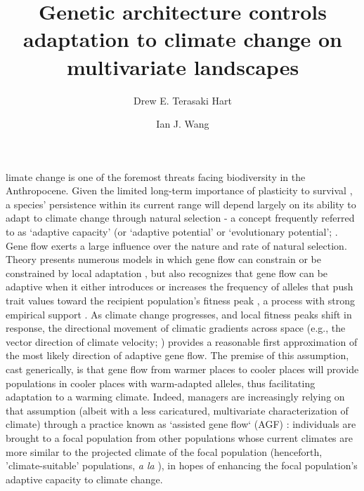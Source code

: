 \documentclass[9pt,twocolumn,twoside,lineno]{pnas-new}
\title{Genetic architecture controls adaptation to climate change on multivariate landscapes}
\author[a,1]{Drew E. Terasaki Hart}
\author[a]{Ian J. Wang}
\affil[a]{Department of Environmental Science, Policy, and Management, University of California, Berkeley, CA 94720}
\begin{document}
\maketitle
\thispagestyle{firststyle}

limate change is one of the foremost threats facing biodiversity in the Anthropocene.
Given the limited long-term importance of plasticity to survival \cite{chevin},
a species’ persistence within its current range will depend largely on its ability to
adapt to climate change through natural selection - a concept frequently referred to 
as `adaptive capacity’ (or `adaptive potential’ or `evolutionary potential’; 
\cite{chevin,harrisson,nicotra,vilas,wade}.
Gene flow exerts a large influence over the nature and rate of natural selection. 
Theory presents numerous models
in which gene flow can constrain or be constrained by
local adaptation \cite{wang,lenormand,slatkin,haldane,wright,felsenstein},
but also recognizes that gene flow can be adaptive when it 
either introduces or increases the frequency of alleles 
that push trait values toward
the recipient population's fitness peak \cite{aitken_whitlock,slatkin,tigano},
a process with strong empirical support \cite{feder}. 
As climate change progresses,
and local fitness peaks shift in response, 
the directional movement of climatic gradients across space (e.g., the vector
direction of climate velocity; \cite{ackerly}) provides a reasonable first 
approximation of the most likely direction of adaptive gene flow. The premise of this 
assumption, cast generically, is that gene flow from warmer places to 
cooler places will provide populations in cooler places with warm-adapted alleles,
thus facilitating adaptation to a warming climate. 
Indeed, managers are increasingly relying on that assumption
(albeit with a less caricatured, multivariate characterization of climate)
through a practice known as `assisted gene flow` (AGF) \cite{aitken_whitlock}:
individuals are brought to a focal population
from other populations whose current 
climates are more similar to the projected climate of the focal population
(henceforth, 'climate-suitable' populations, \textit{a la} \cite{bellis}),
in hopes of enhancing the focal population's adaptive capacity to climate change.
\end{document}
